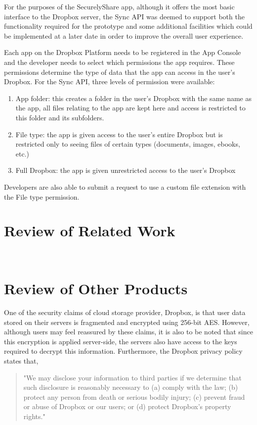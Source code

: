 For the purposes of the SecurelyShare app, although it offers the most basic interface to the Dropbox server, the Sync API was deemed to support both the functionality required for the prototype and some additional facilities which could be implemented at a later date in order to improve the overall user experience.

Each app on the Dropbox Platform needs to be registered in the App Console and the developer needs to select which permissions the app requires. These permissions determine the type of data that the app can access in the user's Dropbox.  For the Sync API, three levels of permission were available:
\begin{enumerate}
\item App folder:  this creates a folder in the user's Dropbox with the same name as the app, all files relating to the app are kept here and access is restricted to this folder and its subfolders.
\item File type: the app is given access to the user's entire Dropbox but is restricted only to seeing files of certain types (documents, images, ebooks, etc.)  
\item Full Dropbox:  the app is given unrestricted access to the user's Dropbox
\end{enumerate}
Developers are also able to submit a request to use a custom file extension with the File type permission.


\section{Review of Related Work }
\label{sec:agke}
\\

\section{Review of Other Products}
\label{sec:other}
One of the security claims of cloud storage provider, Dropbox, is that user data stored on their servers is  fragmented and encrypted using 256-bit AES.  However, although users may feel reassured by these claims, it is also to be noted that since this encryption is applied server-side, the servers also have access to the keys required to decrypt this information.  Furthermore, the   Dropbox privacy policy states that,  
\begin{quotation}
"We may disclose your information to third parties if we determine that such disclosure is reasonably necessary to (a) comply with the law; (b) protect any person from death or serious bodily injury; (c) prevent fraud or abuse of Dropbox or our users; or (d) protect Dropbox's property rights." 
\end{quotation} 

